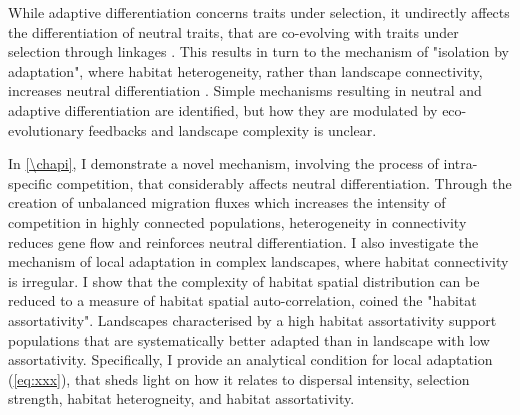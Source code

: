 % 
% 
While adaptive differentiation concerns traits under selection, it undirectly affects the differentiation of neutral traits, that are co-evolving with traits under selection through linkages \citep{Billiard2015,Lepers2021}. This results in turn to the mechanism of "isolation by adaptation", where habitat heterogeneity, rather than landscape connectivity, increases neutral differentiation \citep{nosil2008}. 
% 
Simple mechanisms resulting in neutral and adaptive differentiation are identified, but how they are modulated by eco-evolutionary feedbacks and landscape complexity is unclear. %

In \cref{\chapi}, I demonstrate a novel mechanism, involving the process of intra-specific competition, that considerably affects neutral differentiation. Through the creation of unbalanced migration fluxes which increases the intensity of competition in highly connected populations, heterogeneity in connectivity reduces gene flow and reinforces neutral differentiation. %
% 
I also investigate the mechanism of local adaptation in complex landscapes, where habitat connectivity is irregular. I show that the complexity of habitat spatial distribution can be reduced to a measure of habitat spatial auto-correlation, coined the "habitat assortativity". Landscapes characterised by a high habitat assortativity support populations that are systematically better adapted than in landscape with low assortativity. Specifically, I provide an analytical condition for local adaptation  (\cref{eq:xxx}), that sheds light on how it relates to dispersal intensity, selection strength, habitat heterogneity, and habitat assortativity.

